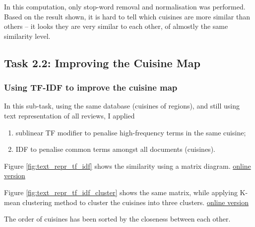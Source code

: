 \documentclass[11pt]{article}
\begin{document}
In this computation, only stop-word removal and normalisation was performed.
Based on the result shown, it is hard to tell which cuisines are more similar than others -- it looks they are very similar to each other, of almostly the same similarity level.

\subsection{Task 2.2: Improving the Cuisine Map}
\subsubsection{Using TF-IDF to improve the cuisine map}
In this sub-task, using the same database (cuisines of regions), and still using text representation of all reviews, I applied
\begin{enumerate}
    \item sublinear TF modifier to penalise high-frequency terms in the same cuisine;
    \item IDF to penalise common terms amongst all documents (cuisines).
\end{enumerate}


\vspace{1em}
Figure \ref{fig:text_repr_tf_idf} shows the similarity using a matrix diagram.
\href{http://jiacheng-pan.me/standalone/datamining_capstone/task2/text_repr_tf_idf.html}{online version}

Figure \ref{fig:text_repr_tf_idf_cluster} shows the same matrix, while applying K-mean clustering method to cluster the cuisines into three clusters.
\href{http://jiacheng-pan.me/standalone/datamining_capstone/task2/text_repr_tf_idf_cluster.html}{online version}

The order of cuisines has been sorted by the closeness between each other.
\end{document}
